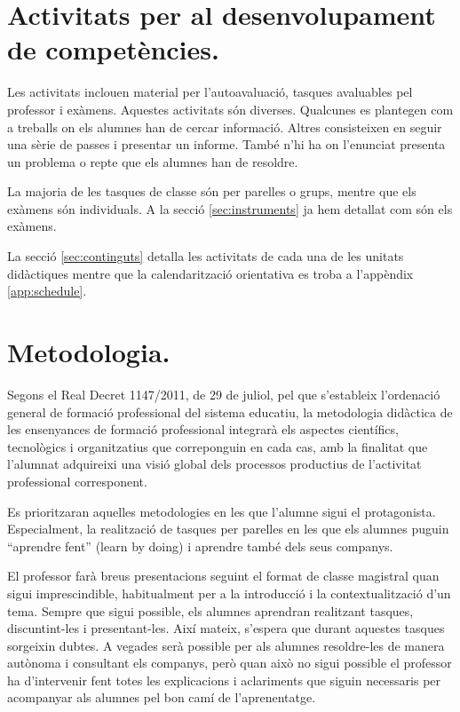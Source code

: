 \documentclass[catalan, a4paper, 12pt, titlepage]{article}
\begin{document}
\section{Activitats per al desenvolupament de competències.}
\label{sec:activitats}

Les activitats inclouen material per l'autoavaluació, tasques avaluables pel professor i exàmens.
Aquestes activitats són diverses.
Qualcunes es plantegen com a treballs on els alumnes han de cercar informació.
Altres consisteixen en seguir una sèrie de passes i presentar un informe.
També n'hi ha on l'enunciat presenta un problema o repte que els alumnes han de resoldre.

La majoria de les tasques de classe són per parelles o grups, mentre que els exàmens són individuals.
A la secció \ref{sec:instruments} ja hem detallat com són els exàmens.

La secció \ref{sec:continguts} detalla les activitats de cada una de les unitats didàctiques mentre que la calendarització orientativa es troba a l'appèndix \ref{app:schedule}.

\section{Metodologia.}
\label{sec:metodologia}

Segons el Real Decret 1147/2011, de 29 de juliol, pel que s'estableix l'ordenació general de formació professional del sistema educatiu, la metodologia didàctica de les ensenyances de formació professional integrarà els aspectes científics, tecnològics i organitzatius que correponguin en cada cas, amb la finalitat que l'alumnat adquireixi una visió global dels processos productius de l'activitat professional corresponent.

Es prioritzaran aquelles metodologies en les que l'alumne sigui el protagonista. Especialment, la realització de tasques per parelles en les que els alumnes puguin ``aprendre fent'' (learn by doing) i aprendre també dels seus companys.

El professor farà breus presentacions seguint el format de classe magistral quan sigui imprescindible, habitualment per a la introducció i la contextualització d'un tema.
Sempre que sigui possible, els alumnes aprendran realitzant tasques, discuntint-les i presentant-les.
Així mateix, s'espera que durant aquestes tasques sorgeixin dubtes. 
A vegades serà possible per als alumnes resoldre-les de manera autònoma i consultant els companys, però quan això no sigui possible el professor ha d'intervenir fent totes les explicacions i aclariments que siguin necessaris per acompanyar als alumnes pel bon camí de l'aprenentatge.
\end{document}

